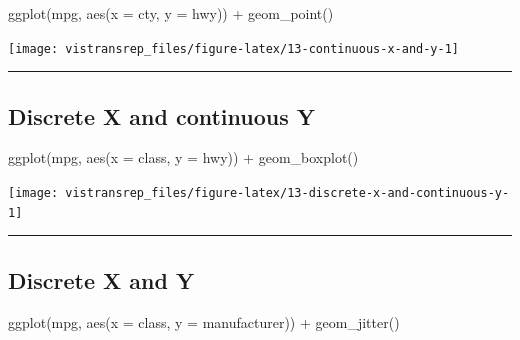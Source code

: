 \documentclass[]{book}
\newenvironment{Shaded}{}{}
\newcommand{\DataTypeTok}[1]{#1}
\newcommand{\KeywordTok}[1]{\textcolor[rgb]{0.00,0.00,1.00}{#1}}
\newcommand{\NormalTok}[1]{#1}
\newcommand{\OperatorTok}[1]{#1}
\newcommand{\StringTok}[1]{\textcolor[rgb]{0.00,0.50,0.50}{#1}}
\begin{document}
\begin{Shaded}
\begin{Highlighting}[]
\KeywordTok{ggplot}\NormalTok{(mpg, }\KeywordTok{aes}\NormalTok{(}\DataTypeTok{x =}\NormalTok{ cty, }\DataTypeTok{y =}\NormalTok{ hwy)) }\OperatorTok{+}
\StringTok{  }\KeywordTok{geom_point}\NormalTok{()}
\end{Highlighting}
\end{Shaded}

\begin{flushright}\texttt{[image: vistransrep\_files/figure-latex/13-continuous-x-and-y-1]} \end{flushright}

\begin{center}\rule{0.5\linewidth}{\linethickness}\end{center}

\hypertarget{discrete-x-and-continuous-y}{%
\subsection{Discrete X and continuous Y}\label{discrete-x-and-continuous-y}}

\begin{Shaded}
\begin{Highlighting}[]
\KeywordTok{ggplot}\NormalTok{(mpg, }\KeywordTok{aes}\NormalTok{(}\DataTypeTok{x =}\NormalTok{ class, }\DataTypeTok{y =}\NormalTok{ hwy)) }\OperatorTok{+}
\StringTok{  }\KeywordTok{geom_boxplot}\NormalTok{()}
\end{Highlighting}
\end{Shaded}

\begin{flushright}\texttt{[image: vistransrep\_files/figure-latex/13-discrete-x-and-continuous-y-1]} \end{flushright}

\begin{center}\rule{0.5\linewidth}{\linethickness}\end{center}

\hypertarget{discrete-x-and-y}{%
\subsection{Discrete X and Y}\label{discrete-x-and-y}}

\begin{Shaded}
\begin{Highlighting}[]
\KeywordTok{ggplot}\NormalTok{(mpg, }\KeywordTok{aes}\NormalTok{(}\DataTypeTok{x =}\NormalTok{ class, }\DataTypeTok{y =}\NormalTok{ manufacturer)) }\OperatorTok{+}
\StringTok{  }\KeywordTok{geom_jitter}\NormalTok{()}
\end{Highlighting}
\end{Shaded}
\end{document}
